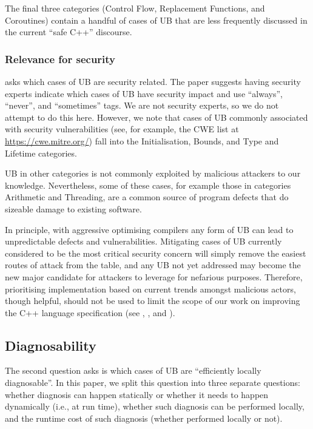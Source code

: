 The final three categories (Control Flow, Replacement Functions, and Coroutines) contain a handful of cases of UB that are less frequently discussed in the current ``safe C++'' discourse.

\subsubsection{Relevance for security}

\cite{P3656R1} asks which cases of UB are security related. The paper suggests having security experts indicate which cases of UB have security impact and use ``always'', ``never'', and ``sometimes'' tags. We are not security experts, so we do not attempt to do this here. However, we note that cases of UB commonly associated with security vulnerabilities (see, for example, the CWE list at \url{https://cwe.mitre.org/}) fall into the Initialisation, Bounds, and Type and Lifetime categories. 

UB in other categories is not commonly exploited by malicious attackers to our knowledge. Nevertheless, some of these cases, for example those in categories Arithmetic and Threading, are a common source of program defects that do sizeable damage to existing software.

In principle, with aggressive optimising compilers any form of UB can lead to unpredictable defects and vulnerabilities. Mitigating cases of UB currently considered to be the most critical security concern will simply remove the easiest routes of attack from the table, and any UB not yet addressed may become the new major candidate for attackers to leverage for nefarious purposes.  Therefore, prioritising implementation based on current trends amongst malicious actors, though helpful, should not be used to limit the scope of our work on improving the C++ language specification (see \cite{Sutter2024}, \cite{P3500R1}, and \cite{P3578R0}).

\subsection{Diagnosability} 
\label{diagnose}

The second question \cite{P3656R1} asks is which cases of UB are ``efficiently locally diagnosable''. In this paper, we split this question into three separate questions: whether diagnosis can happen statically or whether it needs to happen dynamically (i.e., at run time), whether such diagnosis can be performed locally, and the runtime cost of such diagnosis (whether performed locally or not).

